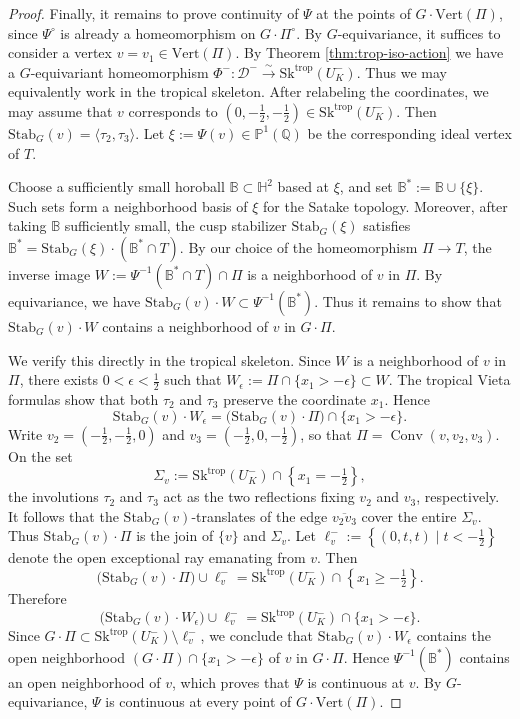 \documentclass[reqno, 12pt]{amsart}
\theoremstyle{definition}
\newcommand{\bP}{\mathbb{P}}
\newcommand{\bQ}{\mathbb{Q}}
\newcommand{\cD}{\mathcal{D}}
\newcommand{\trop}{\mathrm{trop}}
\newcommand{\Sk}{\mathrm{Sk}}
\newcommand{\bH}{\mathbb{H}}
\newcommand{\VPi}{\mathrm{Vert}(\Pi)}
\newcommand{\Stab}{\mathrm{Stab}}
\numberwithin{equation}{section}
\begin{document}
\begin{proof}
Finally, it remains to prove continuity of $\Psi$ at the points of
$G\cdot\VPi$, since $\Psi^\circ$ is already a homeomorphism on
$G\cdot\Pi^\circ$. By $G$-equivariance, it suffices to consider a
vertex $v=v_1\in\VPi$. By Theorem \ref{thm:trop-iso-action} we have a $G$-equivariant homeomorphism $\Phi^-:\cD^-\xrightarrow{\sim}\Sk^{\trop}(U^-_K)$. Thus  we may equivalently work in the
tropical skeleton. After relabeling the coordinates, we may assume that
$v$ corresponds to $
(0,-\tfrac12,-\tfrac12)\in\Sk^{\trop}(U^-_K)$.
Then $\Stab_G(v)=\langle\tau_2,\tau_3\rangle$.
Let $\xi:=\Psi(v)\in\bP^1(\bQ)$ be the corresponding ideal vertex of
$T$.

Choose a sufficiently small horoball $\mathbb{B}\subset\bH^2$ based at $\xi$,
and set
$\mathbb{B}^*:=\mathbb{B}\cup\{\xi\}$.
Such sets form a neighborhood basis of $\xi$ for the Satake topology.
Moreover, after taking $\mathbb{B}$ sufficiently small, the cusp stabilizer
$\Stab_G(\xi)$ satisfies
$\mathbb{B}^*=\Stab_G(\xi)\cdot(\mathbb{B}^*\cap T)$.
By our choice of the homeomorphism $\Pi\to T$, the inverse image $W:=\Psi^{-1}(\mathbb{B}^*\cap T)\cap\Pi$
is a neighborhood of $v$ in $\Pi$. By equivariance, we have $\Stab_G(v)\cdot W\subset \Psi^{-1}(\mathbb{B}^*)$.
Thus it remains to show that $\Stab_G(v)\cdot W$ contains a neighborhood
of $v$ in $G\cdot\Pi$.

We verify this directly in the tropical skeleton.
Since $W$ is a neighborhood of $v$ in $\Pi$, there exists
$0<\epsilon<\frac12$ such that
$W_\epsilon:=\Pi\cap\{x_1>-\epsilon\}\subset W$.
The tropical Vieta formulas show that both $\tau_2$ and $\tau_3$
preserve the coordinate $x_1$. Hence
\[
\Stab_G(v)\cdot W_\epsilon
=
\bigl(\Stab_G(v)\cdot\Pi\bigr)\cap\{x_1>-\epsilon\}.
\]
Write $v_2=\left(-\frac12,-\frac12,0\right)$ and $
v_3=\left(-\frac12,0,-\frac12\right)$,
so that $\Pi=\operatorname{Conv}(v,v_2,v_3)$. On the set
\[
\Sigma_v:=\Sk^{\trop}(U^-_K)\cap\left\{x_1=-\tfrac12\right\},
\]
the involutions $\tau_2$ and $\tau_3$ act as the two reflections fixing 
$v_2$ and $v_3$, respectively. It follows that the
$\Stab_G(v)$-translates of the edge $\overline{v_2 v_3}$ cover the entire $\Sigma_v$. Thus 
$\Stab_G(v)\cdot\Pi$ is the join of $\{v\}$ and $\Sigma_v$.
Let $\ell_v^-:=\left\{(0,t,t)\mid t<-\frac12\right\}$
denote the open exceptional ray emanating from $v$. Then
\[
\bigl(\Stab_G(v)\cdot\Pi\bigr)\cup\ell_v^-
=
\Sk^{\trop}(U^-_K)\cap\left\{x_1\ge-\tfrac12\right\}.
\]
Therefore
\[
\bigl(\Stab_G(v)\cdot W_\epsilon\bigr)\cup\ell_v^-
=
\Sk^{\trop}(U^-_K)\cap\{x_1>-\epsilon\}.
\]
Since $G\cdot \Pi \subset \Sk^{\trop}(U_K^-)\setminus \ell_v^-$,
we conclude that
$\Stab_G(v)\cdot W_\epsilon$ contains the open neighborhood $(G\cdot\Pi)\cap\{x_1>-\epsilon\}$ of $v$ in $G\cdot\Pi$.
Hence $\Psi^{-1}(\mathbb{B}^*)$ contains an open neighborhood of $v$,
which proves that $\Psi$ is continuous at $v$. By $G$-equivariance,
$\Psi$ is continuous at every point of $G\cdot\VPi$.
\end{proof}
\end{document}
